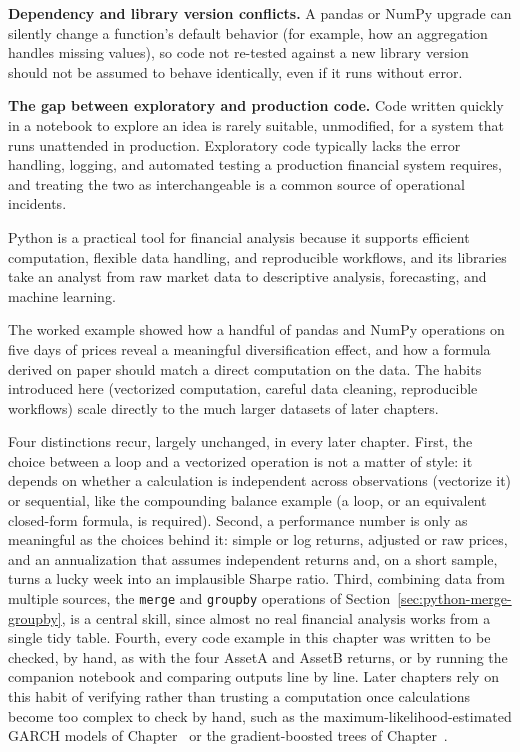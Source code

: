 \documentclass[../ai_in_finance]{subfiles}
\begin{document}
\textbf{Dependency and library version conflicts.} A pandas or NumPy upgrade can silently change a function's default behavior (for example, how an aggregation handles missing values), so code not re-tested against a new library version should not be assumed to behave identically, even if it runs without error.

\textbf{The gap between exploratory and production code.} Code written quickly in a notebook to explore an idea is rarely suitable, unmodified, for a system that runs unattended in production. Exploratory code typically lacks the error handling, logging, and automated testing a production financial system requires, and treating the two as interchangeable is a common source of operational incidents.


Python is a practical tool for financial analysis because it supports efficient computation, flexible data handling, and reproducible workflows, and its libraries take an analyst from raw market data to descriptive analysis, forecasting, and machine learning.

The worked example showed how a handful of pandas and NumPy operations on five days of prices reveal a meaningful diversification effect, and how a formula derived on paper should match a direct computation on the data. The habits introduced here (vectorized computation, careful data cleaning, reproducible workflows) scale directly to the much larger datasets of later chapters.

Four distinctions recur, largely unchanged, in every later chapter. First, the choice between a loop and a vectorized operation is not a matter of style: it depends on whether a calculation is independent across observations (vectorize it) or sequential, like the compounding balance example (a loop, or an equivalent closed-form formula, is required).
Second, a performance number is only as meaningful as the choices behind it: simple or log returns, adjusted or raw prices, and an annualization that assumes independent returns and, on a short sample, turns a lucky week into an implausible Sharpe ratio. Third, combining data from multiple sources, the \texttt{merge} and \texttt{groupby} operations of Section~\ref{sec:python-merge-groupby}, is a central skill, since almost no real financial analysis works from a single tidy table.
Fourth, every code example in this chapter was written to be checked, by hand, as with the four AssetA and AssetB returns, or by running the companion notebook and comparing outputs line by line. Later chapters rely on this habit of verifying rather than trusting a computation once calculations become too complex to check by hand, such as the maximum-likelihood-estimated GARCH models of Chapter~ or the gradient-boosted trees of Chapter~.
\end{document}
